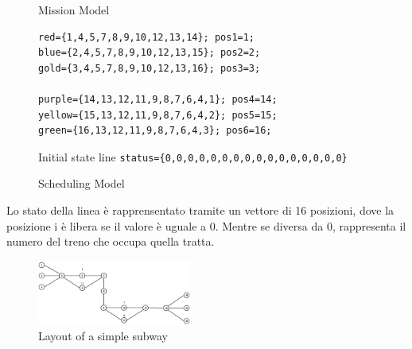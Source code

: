 \documentclass{ewic}
\begin{document}
\begin{figure}[!htp]

 
  \begin{SubFloat}{\label{fig:lmissionm}Mission Model}
  
  \begin{minipage}{2.9in}
\begin{verbatim}
red={1,4,5,7,8,9,10,12,13,14}; pos1=1;
blue={2,4,5,7,8,9,10,12,13,15}; pos2=2;
gold={3,4,5,7,8,9,10,12,13,16}; pos3=3;

purple={14,13,12,11,9,8,7,6,4,1}; pos4=14;
yellow={15,13,12,11,9,8,7,6,4,2}; pos5=15;
green={16,13,12,11,9,8,7,6,4,3}; pos6=16;

\end{verbatim}
\end{minipage}%
  

\label{fig:missionm}
\end{SubFloat}
 
 \begin{SubFloat}{Initial state line\label{fig:lstateline}}
  \centering
\verb|status={0,0,0,0,0,0,0,0,0,0,0,0,0,0,0,0}|
 \label{fig:stateline}
\end{SubFloat}

\caption{Scheduling Model}
 \label{fig:SchedulingModel}
 \end{figure}


%
%
%
%

Lo stato della linea è rapprensentato tramite un vettore di 16 posizioni, dove la posizione i è libera se il valore è uguale a 0. Mentre se diversa da 0, rappresenta il numero del treno che occupa quella tratta.
%
%
%
%
%

\begin{figure}[htp]
	\begin{centering}	
	\includegraphics[width=0.45\textwidth, clip]{img/esempio}
	\caption{Layout of a simple subway}
	\label{fig:example}
	\end{centering}
\end{figure}
\end{document}
